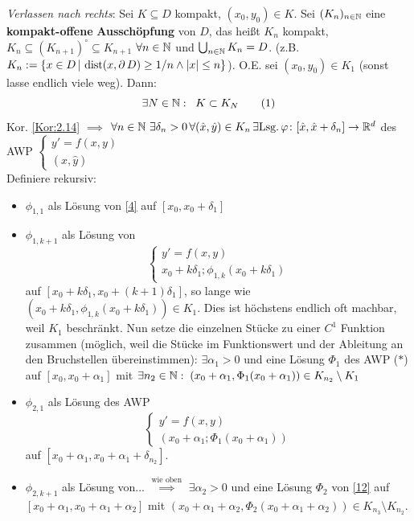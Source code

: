 \documentclass[a4paper]{article}
\begin{document}
\begin{Beweis}
\textit{Verlassen nach \glqq{}rechts\grqq}: Sei $K\subseteq D$ kompakt, $(x_0,y_0)\in K$. Sei $(K_n)_{n\in\operatorname{\mathbb N}}$ eine \textbf{kompakt-offene}\linebreak
\textbf{Ausschöpfung} von $D$, das heißt $K_n$ kompakt, $K_n\subseteq (K_{n+1})^{\circ}\subseteq K_{n+1}$ $\forall n\in\operatorname{\mathbb N}$ und $\bigcup_{n\in\operatorname{\mathbb N}}K_n=D$. (z.B. $K_n:=\{x\in D\,|\,\operatorname{\mathrm{dist}}(x,\operatorname{\partial} D)\ge 1/n\wedge |x|\le n\}$). O.E. sei $(x_0,y_0)\in K_1$ (sonst lasse endlich viele weg). Dann:
\[\exists N\in\operatorname{\mathbb N}:\;\;K\subset K_N\tag{$1$}\label{11}\]
Kor. \ref{Kor:2.14} $\implies$ $\forall n\in\operatorname{\mathbb N}\,\exists\delta_n>0\,\forall (\hat{x},\hat{y})\in K_n\,\exists \text{Lsg.} \operatorname{\varphi}\colon [\hat{x},\hat{x}+\delta_n]\to\mathbb R^d$ des AWP $\left\{ \begin{array}{c}
y'=f(x,y)\\
(\hat{x},\hat{y})
\end{array}\right. $\\
Definiere rekursiv:
\begin{itemize}
\item $\phi_{1,1}$ als Lösung von \eqref{4} auf $[x_0,x_0+\delta_1]$
\item $\phi_{1,k+1}$ als Lösung von 
\[\left\{ \begin{array}{l}
y'=f(x,y)\\
x_0+k\delta_1;\phi_{1,k}(x_0+k\delta_1)
\end{array}\right. \]
auf $[x_0+k\delta_1,x_0+(k+1)\delta_1]$, so lange wie $(x_0+k\delta_1,\phi_{1,k}(x_0+k\delta_1))\in K_1$. Dies ist höchstens endlich oft machbar, weil $K_1$ beschränkt. Nun setze die einzelnen Stücke zu einer $C^1$ Funktion zusammen (möglich, weil die Stücke im Funktionswert und der Ableitung an den Bruchstellen übereinstimmen): $\exists \alpha_1>0$ und eine Lösung $\Phi_1$ des AWP ($*$) auf  $[x_0,x_0+\alpha_1]$ mit $\exists n_2\in\operatorname{\mathbb N}:\;(x_0+\alpha_1,\Phi_1(x_0+\alpha_1))\in K_{n_2}\setminus K_1$
\item $\phi_{2,1}$ als Lösung des AWP 
\[
\left\{ \begin{array}{l}
y'=f(x,y)\\
(x_0+\alpha_1;\Phi_1(x_0+\alpha_1))
\end{array}\right. \tag{$2$}\label{12}
\]
auf $[x_0+\alpha_1,x_0+\alpha_1+\delta_{n_2}]$.
\item $\phi_{2,k+1}$ als Lösung von... $\overset{\text{wie oben}}{\implies}$ $\exists \alpha_2>0$ und eine Lösung $\Phi_2$ von \eqref{12} auf $[x_0+\alpha_1,x_0+\alpha_1+\alpha_2]$ mit $(x_0+\alpha_1+\alpha_2,\Phi_2(x_0+\alpha_1+\alpha_2))\in K_{n_3}\setminus K_{n_2}$.

\end{itemize}
\end{Beweis}
\end{document}
